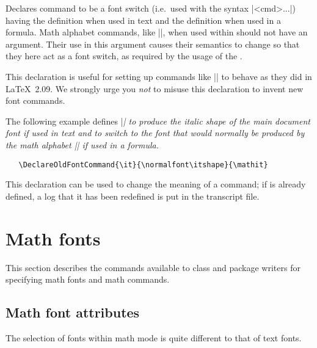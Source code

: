 \documentclass{ltxguide}[1995/11/28]
\begin{document}
Declares command  to be a font switch (i.e.~used with the
syntax |{<cmd>...}|) having the definition 
when used in text and the definition  when used in a
formula.
Math alphabet commands, like |\mathit|, when used within 
should not have an argument.  Their use in this argument causes their
semantics to change so that they here act as a font switch, as
required by the usage of the .

This declaration is useful for setting up commands like |\rm| to behave
as they did in \LaTeX~2.09. We strongly urge you \emph{not} to misuse
this declaration to invent new font commands.

The following example defines |\it| to produce the italic shape of the
main document font if used in text and to switch to the font that would
normally be produced by the math alphabet |\mathit| if used in a
formula.
\begin{verbatim}
   \DeclareOldFontCommand{\it}{\normalfont\itshape}{\mathit}
\end{verbatim}

This declaration can be used to change the meaning of a command; if
 is already defined, a log that it has been redefined is put in
the transcript file.


\section{Math fonts}
\label{Sec:math}

This section describes the commands available to class and package
writers for specifying math fonts and math commands.

\subsection{Math font attributes}

The selection of fonts within math mode is quite different to that of
text fonts.
\end{document}
